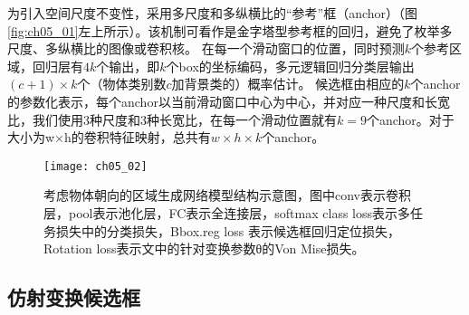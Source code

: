 为引入空间尺度不变性，采用多尺度和多纵横比的“参考”框（anchor）（图\ref{fig:ch05_01}左上所示）。该机制可看作是金字塔型参考框的回归，避免了枚举多尺度、多纵横比的图像或卷积核。
在每一个滑动窗口的位置，同时预测$k$个参考区域，回归层有$4k$个输出，即$k$个box的坐标编码，多元逻辑回归分类层输出$(c+1)×k$个（物体类别数$c$加背景类的）概率估计。
候选框由相应的$k$个anchor的参数化表示，每个anchor以当前滑动窗口中心为中心，并对应一种尺度和长宽比，我们使用3种尺度和3种长宽比，在每一个滑动位置就有$k=9$个anchor。对于大小为w×h的卷积特征映射，总共有$w \times h\times k$个anchor。

\begin{figure}[!htbp]
\centering
\texttt{[image: ch05\_02]}
\caption{考虑物体朝向的区域生成网络模型结构示意图，图中conv表示卷积层，pool表示池化层，FC表示全连接层，softmax class loss表示多任务损失中的分类损失，Bbox.reg loss 表示候选框回归定位损失，Rotation loss表示文中的针对变换参数θ的Von Mise损失。}
\label{fig:ch05_02}
\end{figure} 

\subsection{仿射变换候选框}
 
